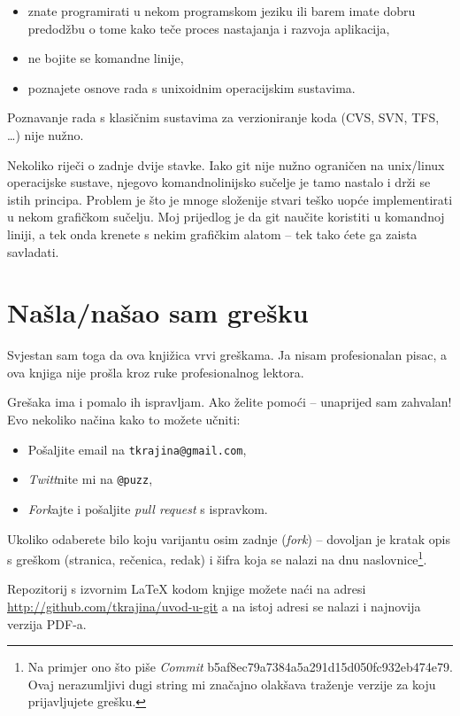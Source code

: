 \begin{itemize}
	\item znate programirati u nekom programskom jeziku ili barem imate dobru predodžbu o tome kako teče proces nastajanja i razvoja aplikacija,
	\item ne bojite se komandne linije,
	\item poznajete osnove rada s unixoidnim operacijskim sustavima.
\end{itemize}

Poznavanje rada s klasičnim sustavima za verzioniranje koda (CVS, SVN, TFS, \dots) nije nužno.

Nekoliko riječi o zadnje dvije stavke.
Iako git nije nužno ograničen na unix/linux operacijske sustave, njegovo komandnolinijsko sučelje je tamo nastalo i drži se istih principa.
Problem je što je mnoge složenije stvari teško uopće implementirati u nekom grafičkom sučelju. 
Moj prijedlog je da git naučite koristiti u komandnoj liniji, a tek onda krenete s nekim grafičkim alatom -- tek tako ćete ga zaista savladati.

\section*{Našla/našao sam grešku}

Svjestan sam toga da ova knjižica vrvi greškama.
Ja nisam profesionalan pisac, a ova knjiga nije prošla kroz ruke profesionalnog lektora.

Grešaka ima i pomalo ih ispravljam.
Ako želite pomoći -- unaprijed sam zahvalan!
Evo nekoliko načina kako to možete učniti:

\begin{itemize}
    \item Pošaljite email na \verb+tkrajina@gmail.com+,
    \item \emph{Twitt}nite mi na \verb+@puzz+,
    \item \emph{Fork}ajte i pošaljite \emph{pull request} s ispravkom. 
\end{itemize}

Ukoliko odaberete bilo koju varijantu osim zadnje (\emph{fork}) -- dovoljan je kratak opis s greškom (stranica, rečenica, redak) i šifra koja se nalazi na dnu naslovnice\footnote{Na primjer ono što piše \emph{Commit} b5af8ec79a7384a5a291d15d050fc932eb474e79. Ovaj nerazumljivi dugi string mi značajno olakšava traženje verzije za koju prijavljujete grešku.}.

Repozitorij s izvornim \LaTeX{} kodom knjige možete naći na adresi \\\url{http://github.com/tkrajina/uvod-u-git}
 a na istoj adresi se nalazi i najnovija verzija PDF-a.

